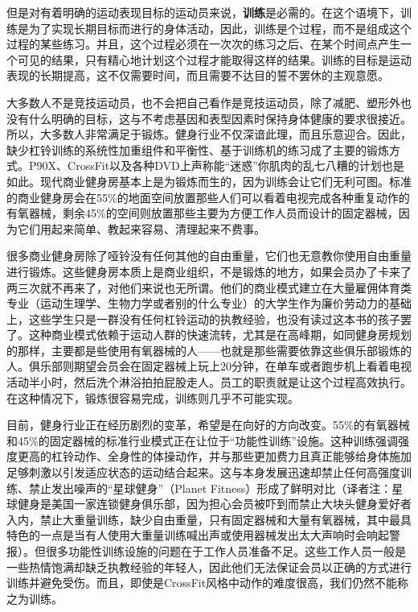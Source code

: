 但是对有着明确的运动表现目标的运动员来说，\textbf{训练}是必需的。在这个语境下，训练是为了实现长期目标而进行的身体活动，因此，训练是个过程，而不是组成这个过程的某些练习。并且，这个过程必须在一次次的练习之后、在某个时间点产生一个可见的结果，只有精心地计划这个过程才能取得这样的结果。训练的目标是运动表现的长期提高，这不仅需要时间，而且需要不达目的誓不罢休的主观意愿。

大多数人不是竞技运动员，也不会把自己看作是竞技运动员，除了减肥、塑形外也没有什么明确的目标，这与不考虑基因和表型因素时保持身体健康的要求很接近。所以，大多数人非常满足于锻炼。健身行业不仅深谙此理，而且乐意迎合。因此，缺少杠铃训练的系统性加重组件和平衡性、基于训练机的练习成了主要的锻炼方式。P90X、CrossFit以及各种DVD上声称能“迷惑”你肌肉的乱七八糟的计划也是如此。现代商业健身房基本上是为锻炼而生的，因为训练会让它们无利可图。标准的商业健身房会在55\%的地面空间放置那些人们可以看着电视完成各种重复动作的有氧器械，剩余45\%的空间则放置那些主要为方便工作人员而设计的固定器械，因为它们用起来简单、教起来容易、清理起来不费事。

很多商业健身房除了哑铃没有任何其他的自由重量，它们也无意教你使用自由重量进行锻炼。这些健身房本质上是商业组织，不是锻炼的地方，如果会员办了卡来了两三次就不再来了，对他们来说也无所谓。他们的商业模式建立在大量雇佣体育类专业（运动生理学、生物力学或者别的什么专业）的大学生作为廉价劳动力的基础上，这些学生只是一群没有任何杠铃运动的执教经验，也没有读过这本书的孩子罢了。这种商业模式依赖于运动人群的快速流转，尤其是在高峰期，如同健身房规划的那样，主要都是些使用有氧器械的人——也就是那些需要依靠这些俱乐部锻炼的人。俱乐部则期望会员会在固定器械上玩上20分钟，在单车或者跑步机上看着电视活动半小时，然后洗个淋浴拍拍屁股走人。员工的职责就是让这个过程高效执行。在这种情况下，锻炼很容易完成，训练则几乎不可能实现。

目前，健身行业正在经历剧烈的变革，希望是在向好的方向改变。55\%的有氧器械和45\%的固定器械的标准行业模式正在让位于“功能性训练”设施。这种训练强调强度更高的杠铃动作、全身性的体操动作，并与那些更加费力且真正能够给身体施加足够刺激以引发适应状态的运动结合起来。这与本身发展迅速却禁止任何高强度训练、禁止发出噪声的“星球健身”（Planet Fitness）形成了鲜明对比（译者注：星球健身是美国一家连锁健身俱乐部，因为担心会员被吓到而禁止大块头健身爱好者入内，禁止大重量训练，缺少自由重量，只有固定器械和大量有氧器械，其中最具特色的一点是当有人使用大重量训练喊出声或使用器械发出太大声响时会响起警报）。但很多功能性训练设施的问题在于工作人员准备不足。这些工作人员一般是一些热情饱满却缺乏执教经验的年轻人，因此他们无法保证会员以正确的方式进行训练并避免受伤。而且，即使是CrossFit风格中动作的难度很高，我们仍然不能称之为训练。

